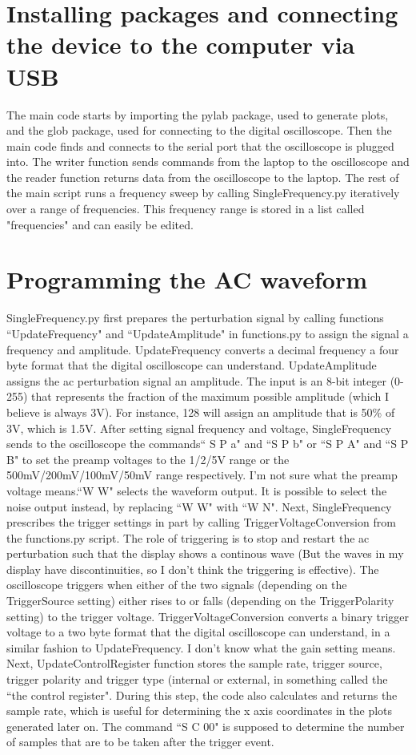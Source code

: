 \section{Installing packages and connecting the device to the computer via USB}
The main code starts by importing the pylab package, used to generate plots, and the glob package,
used for connecting to the digital oscilloscope. Then the main code finds and connects to the serial port that the oscilloscope is plugged into. The writer function sends commands from the laptop to the  oscilloscope and the reader function returns data from the  oscilloscope to the laptop. The rest of the main script runs a frequency sweep by calling SingleFrequency.py iteratively over a range of frequencies. This frequency range is stored in a list called "frequencies" and can easily be edited.   
\section{Programming the AC waveform}
SingleFrequency.py  first prepares the perturbation signal by calling functions ``UpdateFrequency" and ``UpdateAmplitude" in functions.py to assign the signal a frequency and amplitude.  UpdateFrequency converts a decimal frequency a four byte format that the digital oscilloscope can understand. UpdateAmplitude assigns the ac perturbation signal an amplitude. The input is an 8-bit integer (0-255) that represents the fraction of the maximum possible amplitude (which I believe is always 3V). For instance, 128 will assign an amplitude that is 50\% of 3V, which is 1.5V. After setting signal frequency and voltage, SingleFrequency sends  to the oscilloscope the commands`` S P a" and ``S P b" or ``S P A"  and ``S P B" to set the preamp voltages to the 1/2/5V range or the 500mV/200mV/100mV/50mV range respectively. I'm not sure what the preamp voltage means.``W W"  selects the waveform output. It is possible to select the noise output instead, by replacing ``W W" with ``W N". Next, SingleFrequency prescribes the trigger settings in part by calling TriggerVoltageConversion from the functions.py script. The role of triggering is to stop and restart the ac perturbation such that the display shows a continous wave (But the waves in my display have discontinuities, so I don't think the triggering is effective).  The oscilloscope triggers when either of the two signals (depending on the TriggerSource setting) either rises to or falls (depending on the TriggerPolarity setting) to the trigger voltage. TriggerVoltageConversion converts a binary trigger voltage to a two byte format that the digital oscilloscope can understand, in a similar fashion to UpdateFrequency. I don't know what the gain setting means.  Next, UpdateControlRegister function stores the sample rate, trigger source, trigger polarity and trigger type (internal or external, in something called the ``the control register". During this step, the code also calculates and returns the sample rate, which is useful for determining the x axis coordinates in the plots generated later on. The command ``S C 00" is supposed to determine the number of samples that are to be taken after the trigger event. 
